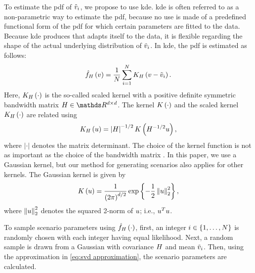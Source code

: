 To estimate the \ac{pdf} of $\tilde{v}_{i}$, we propose to use \ac{kde}.
\ac{kde} \autocite{rosenblatt1956remarks, parzen1962estimation} is often referred to as a non-parametric way to estimate the \ac{pdf}, because no use is made of a predefined functional form of the \ac{pdf} for which certain parameters are fitted to the data.
Because \ac{kde} produces  that adapts itself to the data, it is flexible regarding the shape of the actual underlying distribution of $\tilde{v}_{i}$.
In \ac{kde}, the \ac{pdf} is estimated as follows:
\begin{equation}
	\label{eq:density est kde}
	\hat{f}_{H}\left( v \right) = \frac{1}{N} 
	\sum_{i=1}^{N} K_{H} \left( v - \tilde{v}_{i} \right).
\end{equation}
Here, $K_{H} \left( \cdot \right)$ is the so-called scaled kernel with a positive definite symmetric bandwidth matrix $\bandwidthmatrix \in \realnumbers^{\dimension \times \dimension}$.
The kernel $K \left( \cdot \right)$ and the scaled kernel $K_{H} \left( \cdot \right)$ are related using
\begin{equation}
	K_{H} \left( u \right) = \left|H\right|^{-1/2} K \left( H^{-1/2} u \right),
\end{equation}
where $|\cdot|$ denotes the matrix determinant. 
The choice of the kernel function is not as important as the choice of the bandwidth matrix \autocite{turlach1993bandwidthselection, duong2007ks}.
In this paper, we use a Gaussian kernel, but our method for generating scenarios also applies for other kernels. 
The Gaussian kernel is given by
\begin{equation}
	K \left( u \right) = \frac{1}{\left(2\pi\right)^{d/2}} \exp\left\{ -\frac{1}{2} \left\Vert u \right\Vert_2^2 \right\},
\end{equation}
where $\left\Vert u \right\Vert_2^2$ denotes the squared 2-norm of $u$; i.e., $u^T u$.

To sample scenario parameters using $\hat{f}_{H}\left( \cdot \right)$, first, an integer $i \in \{1,\ldots,N\}$ is randomly chosen with each integer having equal likelihood. 
Next, a random sample is drawn from a Gaussian with covariance $H$ and mean $\tilde{v}_{i}$.
Then, using the approximation in \cref{eq:svd approximation}, the scenario parameters are calculated.
